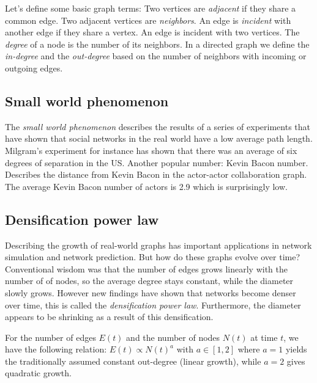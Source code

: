 \bigskip

\noindent Let's define some basic graph terms: Two vertices are \emph{adjacent} if they share a common edge. Two adjacent vertices are \emph{neighbors}. An edge is \emph{incident} with another edge if they share a vertex. An edge is incident with two vertices. The \emph{degree} of a node is the number of its neighbors. In a directed graph we define the \emph{in-degree} and the \emph{out-degree} based on the number of neighbors with incoming or outgoing edges.

\subsection{Small world phenomenon}
\bigskip

The \emph{small world phenomenon} describes the results of a series of experiments that have shown that social networks in the real world have a low average path length. Milgram's experiment for instance has shown that there was an average of six degrees of separation in the US. Another popular number: Kevin Bacon number. Describes the distance from Kevin Bacon in the actor-actor collaboration graph. The average Kevin Bacon number of actors is 2.9 which is surprisingly low.

\subsection{Densification power law}
\bigskip

Describing the growth of real-world graphs has important applications in network simulation and network prediction. But how do these graphs evolve over time? Conventional wisdom was that the number of edges grows linearly with the number of of nodes, so the average degree stays constant, while the diameter slowly grows. However new findings have shown that networks become denser over time, this is called the \emph{densification power law}. Furthermore, the diameter appears to be shrinking as a result of this densification.

\begin{theorem}
For the number of edges $E(t)$ and the number of nodes $N(t)$ at time $t$, we have the following relation: $E(t) \propto N(t)^a$ with $a \in [1,2]$ where $a = 1$ yields the traditionally assumed constant out-degree (linear growth), while $a = 2$ gives quadratic growth.
\end{theorem}

\medskip

